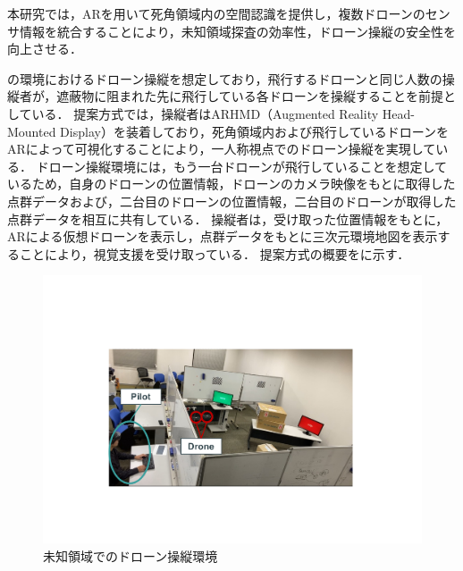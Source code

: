 \documentclass[a4paper,11pt]{ujreport}
\begin{document}
本研究では，ARを用いて死角領域内の空間認識を提供し，複数ドローンのセンサ情報を統合することにより，未知領域探査の効率性，ドローン操縦の安全性を向上させる．
\par
{}の環境におけるドローン操縦を想定しており，飛行するドローンと同じ人数の操縦者が，遮蔽物に阻まれた先に飛行している各ドローンを操縦することを前提としている．
提案方式では，操縦者はARHMD（Augmented Reality Head-Mounted Display）を装着しており，死角領域内および飛行しているドローンをARによって可視化することにより，一人称視点でのドローン操縦を実現している．
ドローン操縦環境には，もう一台ドローンが飛行していることを想定しているため，自身のドローンの位置情報，ドローンのカメラ映像をもとに取得した点群データおよび，二台目のドローンの位置情報，二台目のドローンが取得した点群データを相互に共有している．
操縦者は，受け取った位置情報をもとに，ARによる仮想ドローンを表示し，点群データをもとに三次元環境地図を表示することにより，視覚支援を受け取っている．
提案方式の概要をに示す．



\begin{figure}[tb]
  \centering
  \includegraphics[width=0.7\linewidth]{img/03_enviroment.pdf}
  \caption{未知領域でのドローン操縦環境}
  \label{fig:03_enviroment}
\end{figure}
\end{document}
